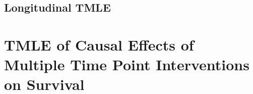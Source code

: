 \documentclass[t]{beamer}
\begin{document}







\subsection{Longitudinal TMLE}

\section{TMLE of Causal Effects of Multiple Time Point Interventions on Survival}
\end{document}
